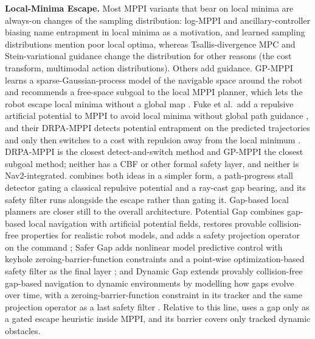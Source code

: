 \noindent\textbf{Local-Minima Escape.} Most MPPI variants that bear on local minima are always-on changes of the sampling distribution: log-MPPI \citep{log_mppi} and ancillary-controller biasing \citep{biased_mppi} name entrapment in local minima as a motivation, and learned sampling distributions \citep{flow_mppi} mention poor local optima, whereas Tsallis-divergence MPC \citep{tsallis_mppi} and Stein-variational guidance \citep{svg_mppi} change the distribution for other reasons (the cost transform, multimodal action distributions). Others add guidance. GP-MPPI learns a sparse-Gaussian-process model of the navigable space around the robot and recommends a free-space subgoal to the local MPPI planner, which lets the robot escape local minima without a global map \citep{gp_mppi}. Fuke et al.\ add a repulsive artificial potential to MPPI to avoid local minima without global path guidance \citep{drpa_sii}, and their DRPA-MPPI detects potential entrapment on the predicted trajectories and only then switches to a cost with repulsion away from the local minimum \citep{drpa_mppi}. DRPA-MPPI is the closest detect-and-switch method and GP-MPPI the closest subgoal method; neither has a CBF or other formal safety layer, and neither is Nav2-integrated. \sname{} combines both ideas in a simpler form, a path-progress stall detector gating a classical repulsive potential \citep{khatib_apf} and a ray-cast gap bearing, and its safety filter runs alongside the escape rather than gating it. Gap-based local planners are closer still to the overall architecture. Potential Gap combines gap-based local navigation with artificial potential fields, restores provable collision-free properties for realistic robot models, and adds a safety projection operator on the command \citep{potential_gap}; Safer Gap adds nonlinear model predictive control with keyhole zeroing-barrier-function constraints and a point-wise optimization-based safety filter as the final layer \citep{safer_gap}; and Dynamic Gap extends provably collision-free gap-based navigation to dynamic environments by modelling how gaps evolve over time, with a zeroing-barrier-function constraint in its tracker and the same projection operator as a last safety filter \citep{dynamic_gap}. Relative to this line, \sname{} uses a gap only as a gated escape heuristic inside MPPI, and its barrier covers only tracked dynamic obstacles.

